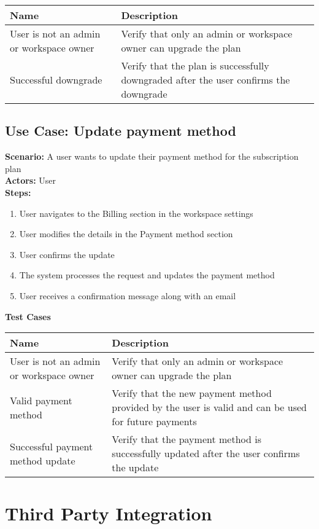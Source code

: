 \documentclass{article}
\begin{document}
            \begin{longtable}{|p{}|p{}|}
            \hline
            \textbf{Name} & \textbf{Description} \\
            \hline
            User is not an admin or workspace owner & Verify that only an admin or workspace owner can upgrade the plan \\
\hline
Successful downgrade & Verify that the plan is successfully downgraded after the user confirms the downgrade \\
\hline
\end{longtable}\subsection{\textbf{Use Case: Update payment method}}
\textbf{Scenario:} A user wants to update their payment method for the subscription plan\\
\textbf{Actors:} User\\
\textbf{Steps:}
\begin{enumerate}
\item User navigates to the Billing section in the workspace settings
\item User modifies the details in the Payment method section
\item User confirms the update
\item The system processes the request and updates the payment method
\item User receives a confirmation message along with an email
\end{enumerate}
\textbf{Test Cases}

            \begin{longtable}{|p{}|p{}|}
            \hline
            \textbf{Name} & \textbf{Description} \\
            \hline
            User is not an admin or workspace owner & Verify that only an admin or workspace owner can upgrade the plan \\
\hline
Valid payment method & Verify that the new payment method provided by the user is valid and can be used for future payments \\
\hline
Successful payment method update & Verify that the payment method is successfully updated after the user confirms the update \\
\hline
\end{longtable}\section{\textbf{Third Party Integration}}
\end{document}
